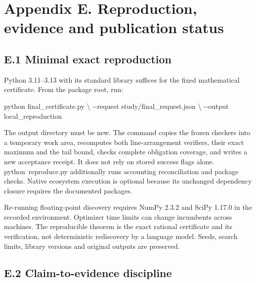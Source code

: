 \documentclass[11pt,a4paper]{article}
\newenvironment{Shaded}{}{}
\newcommand{\AttributeTok}[1]{\textcolor[rgb]{0.49,0.56,0.16}{#1}}
\newcommand{\DataTypeTok}[1]{\textcolor[rgb]{0.56,0.13,0.00}{#1}}
\newcommand{\ExtensionTok}[1]{#1}
\newcommand{\NormalTok}[1]{#1}
\renewcommand{\texttt}[1]{{\ttfamily\small #1}}
\begin{document}

\hypertarget{appendix-e.-reproduction-evidence-and-publication-status}{%
\section{Appendix E. Reproduction, evidence and publication
status}\label{appendix-e.-reproduction-evidence-and-publication-status}}


\hypertarget{e.1-minimal-exact-reproduction}{%
\subsection{E.1 Minimal exact
reproduction}\label{e.1-minimal-exact-reproduction}}

Python 3.11--3.13 with its standard library suffices for the fixed
mathematical certificate. From the package root, run:

\begin{Shaded}
\begin{Highlighting}[]
\ExtensionTok{python}\NormalTok{ final\_certificate.py }\DataTypeTok{\textbackslash{}}
  \AttributeTok{{-}{-}request}\NormalTok{ study/final\_request.json }\DataTypeTok{\textbackslash{}}
  \AttributeTok{{-}{-}output}\NormalTok{ local\_reproduction}
\end{Highlighting}
\end{Shaded}

The output directory must be new. The command copies the frozen checkers
into a temporary work area, recomputes both line-arrangement verifiers,
their exact maximum and the tail bound, checks complete obligation
coverage, and writes a new acceptance receipt. It does not rely on
stored success flags alone. \texttt{python\ reproduce.py} additionally
runs accounting reconciliation and package checks. Native ecosystem
execution is optional because its unchanged dependency closure requires
the documented packages.

Re-running floating-point discovery requires NumPy 2.3.2 and SciPy
1.17.0 in the recorded environment. Optimizer time limits can change
incumbents across machines. The reproducible theorem is the exact
rational certificate and its verification, not deterministic rediscovery
by a language model. Seeds, search limits, library versions and original
outputs are preserved.


\hypertarget{e.2-claim-to-evidence-discipline}{%
\subsection{E.2 Claim-to-evidence
discipline}\label{e.2-claim-to-evidence-discipline}}
\end{document}
